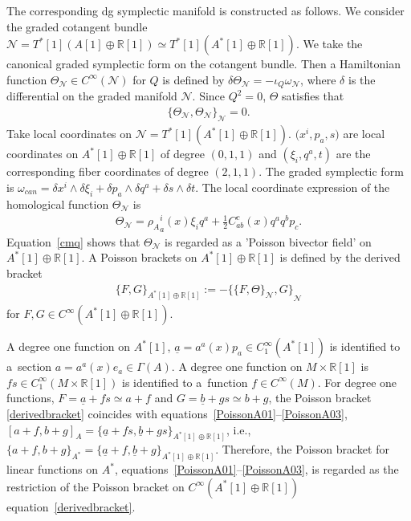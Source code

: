 \documentclass[10pt,a4paper]{amsart}
\numberwithin{equation}{section}
\def\bR{{\mathbb{R}}}
\newcommand{\calN}{{\mathcal N}}
\newcommand{\sbv}[2]{{\{{{#1},{#2}}\}}}
\newcommand{\rhoa}{{\rho_A}}
\newcommand{\omegac}{{\omega_{can}}}
\newcommand{\Thetan}{{\Theta_{\calN}}}
\newcommand{\ua}{{\underline{a}}{}}
\newcommand{\ub}{{\underline{b}}{}}
\begin{document}
The corresponding dg symplectic manifold is constructed as follows.
We consider the graded cotangent bundle
$\calN = T^*[1](A[1] \oplus \bR[1]) \simeq T^*[1](A^*[1] \oplus \bR[1])$.
We take the canonical graded symplectic form on the cotangent bundle.
Then a Hamiltonian function
$\Thetan \in C^{\infty}(\calN)$ for $Q$ is defined by
$
\delta \Thetan = - \iota_Q \omega_{\calN}$,
where $\delta$ is the differential on the graded manifold $\calN$.
Since $Q^2=0$, $\Theta$ satisfies that
\begin{gather}
\sbv{\Thetan}{\Thetan}_{\calN} =0.
\label{cmq}
\end{gather}
Take local coordinates on $\calN = T^*[1](A^*[1] \oplus \bR[1]) $.
$\bigl(x^i, p_a, s\bigr)$ are local coordinates on $A^*[1] \oplus \bR[1]$ of degree $(0, 1, 1)$
and $(\xi_i, q^a, t)$ are the corresponding fiber coordinates
of degree $(2, 1, 1)$.
The graded symplectic form is
$
\omegac = \delta x^i \wedge \delta \xi_i + \delta p_a \wedge \delta q^a
+ \delta s \wedge \delta t$.
The local coordinate expression of the homological function $\Thetan$ is
\begin{gather}
\Thetan =
\rhoa^i_a(x) \xi_i q^a + \frac{1}{2} C_{ab}^c(x) q^a q^b p_c.
\label{homologicalN}
\end{gather}
Equation~\eqref{cmq} shows that $\Thetan$ is regarded as a
'Poisson bivector field' on $A^*[1] \oplus \bR[1]$.
A Poisson brackets on $A^*[1] \oplus \bR[1]$ is defined by the derived bracket
\begin{gather}
\{F, G \}_{A^*[1] \oplus \bR[1]} := - \sbv{\sbv{F}{\Theta}_{\calN}}{G}_{\calN}
\label{derivedbracket}
\end{gather}
for $F, G \in C^{\infty}(A^*[1] \oplus \bR[1])$.

A degree one function on $A^*[1]$, $\ua = a^a(x) p_a \in C_1^{\infty}(A^*[1])$
is identified to a~section $a = a^a(x) e_a \in \Gamma(A)$.
A degree one function on $M \times \bR[1]$ is $f s \in C_1^{\infty}(M \times \bR[1])$ is identified to a~function $f \in C^{\infty}(M)$.
For degree one functions,
$F = \ua + fs \simeq a + f$ and $G = \ub + gs \simeq b + g$,
the Poisson bracket \eqref{derivedbracket} coincides with
equations~\eqref{PoissonA01}--\eqref{PoissonA03},
$
[a + f, b + g]_{A}
= \{\ua + fs, \ub + gs \}_{A^*[1] \oplus \bR[1]}$,
i.e., $\sbv{a + f}{b + g}_{A^*}= \{\ua + f, \ub + g \}_{A^*[1] \oplus \bR[1]}$.
Therefore, the Poisson bracket for linear functions on $A^*$,
equations~\eqref{PoissonA01}--\eqref{PoissonA03}, is regarded as
the restriction of the Poisson bracket on $C^{\infty}({A^*[1] \oplus \bR[1]})$
equation~\eqref{derivedbracket}.
\end{document}
